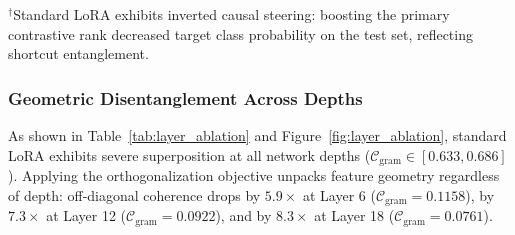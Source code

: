 \documentclass[10pt,twocolumn,letterpaper]{article}
\begin{document}
\begin{table}[t!]
    \centering
    \small
    \caption{\textbf{Layer Depth Ablation Benchmark.} Comprehensive evaluation across Early (Layer 6), Mid (Layer 12), and Late (Layer 18) interventions on \texttt{Qwen-2.5-0.5B}. Ortho-LoRA drives feature cross-talk down across all layers while delivering positive, monotonic target gains ($\Delta P > 0$) that peak at mid-depth.}
    \label{tab:layer_ablation}
    \begin{flushleft}
    \scriptsize{$^\dagger$Standard LoRA exhibits inverted causal steering: boosting the primary contrastive rank decreased target class probability on the test set, reflecting shortcut entanglement.}
    \end{flushleft}
\end{table}

\subsubsection{Geometric Disentanglement Across Depths}
As shown in Table~\ref{tab:layer_ablation} and Figure~\ref{fig:layer_ablation}, standard LoRA exhibits severe superposition at all network depths ($\mathcal{C}_{\text{gram}} \in [0.633, 0.686]$). Applying the orthogonalization objective unpacks feature geometry regardless of depth: off-diagonal coherence drops by \textbf{$5.9\times$} at Layer 6 ($\mathcal{C}_{\text{gram}} = 0.1158$), by \textbf{$7.3\times$} at Layer 12 ($\mathcal{C}_{\text{gram}} = 0.0922$), and by \textbf{$8.3\times$} at Layer 18 ($\mathcal{C}_{\text{gram}} = 0.0761$). 
\end{document}
